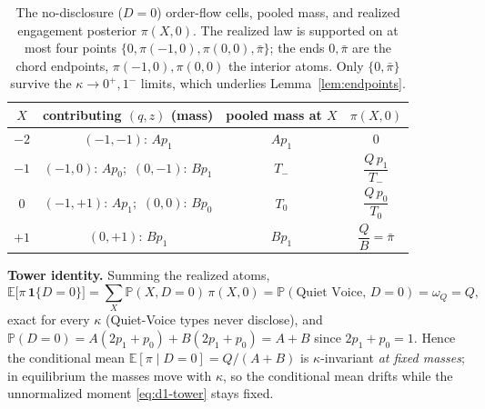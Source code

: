 \documentclass[11pt]{article}
\newcommand{\E}{\mathbb{E}}
\newcommand{\PP}{\mathbb{P}}
\newcommand{\1}{\mathbf{1}}
\begin{document}
\begin{table}[h]
\centering
\renewcommand{\arraystretch}{1.35}
\begin{tabular}{cccc}
\toprule
$X$ & contributing $(q,z)$ (mass) & pooled mass at $X$ & $\pi(X,0)$\\
\midrule
$-2$ & $(-1,-1)$: $A p_1$ & $A p_1$ & $0$\\
$-1$ & $(-1,0)$: $A p_0$;\ $(0,-1)$: $B p_1$ & $T_-$ & $\dfrac{Q\,p_1}{T_-}$\\
$0$  & $(-1,+1)$: $A p_1$;\ $(0,0)$: $B p_0$ & $T_0$ & $\dfrac{Q\,p_0}{T_0}$\\
$+1$ & $(0,+1)$: $B p_1$ & $B p_1$ & $\dfrac{Q}{B}=\bar\pi$\\
\bottomrule
\end{tabular}
\caption{The no-disclosure ($D=0$) order-flow cells, pooled mass, and realized
engagement posterior $\pi(X,0)$. The realized law is supported on at most four
points $\{0,\pi(-1,0),\pi(0,0),\bar\pi\}$; the ends $0,\bar\pi$ are the chord
endpoints, $\pi(-1,0),\pi(0,0)$ the interior atoms. Only $\{0,\bar\pi\}$ survive
the $\kappa\to0^{+},1^{-}$ limits, which underlies
Lemma~\ref{lem:endpoints}.}
\label{tab:d1-D0cells}
\end{table}

\noindent\textbf{Tower identity.} Summing the realized atoms,
\begin{equation}
  \E\!\bigl[\pi\,\1\{D{=}0\}\bigr]
  =\sum_{X}\PP(X,D{=}0)\,\pi(X,0)
  =\PP(\text{Quiet Voice},\,D{=}0)
  =\omega_Q=Q,
  \label{eq:d1-tower}
\end{equation}
exact for every $\kappa$ (Quiet-Voice types never disclose), and
$\PP(D{=}0)=A(2p_1+p_0)+B(2p_1+p_0)=A+B$ since $2p_1+p_0=1$. Hence the
conditional mean $\E[\pi\mid D{=}0]=Q/(A+B)$ is $\kappa$-invariant \emph{at
fixed masses}; in equilibrium the masses move with $\kappa$, so the conditional
mean drifts while the unnormalized moment \eqref{eq:d1-tower} stays fixed.
\end{document}
